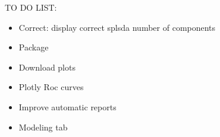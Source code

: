 \documentclass{article}
\begin{document}



TO DO LIST:

\begin{itemize}

\item{Correct: display correct splsda number of components}
\item{Package}
\item{Download plots}
\item{Plotly Roc curves}
\item{Improve automatic reports}
\item{Modeling tab}

\end{itemize}
\end{document}
